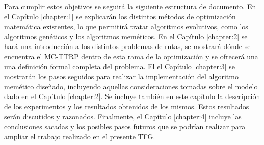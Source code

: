 \documentclass[11pt,a4paper]{book}
\theoremstyle{definition}
\theoremstyle{remark}
\begin{document}
Para cumplir estos objetivos se seguirá la siguiente estructura de documento. En el Capítulo \ref{chapter:1} se explicarán los distintos métodos de optimización matemática existentes, lo que permitirá tratar algoritmos evolutivos, como los algoritmos genéticos y los algoritmos meméticos. En el Capítulo \ref{chapter:2} se hará una introducción a los distintos problemas de rutas, se mostrará dónde se encuentra el MC-TTRP dentro de esta rama de la optimización y se ofrecerá una una definición formal completa del problema. El el Capítulo \ref{chapter:3} se mostrarán los pasos seguidos para realizar la implementación del algoritmo memético diseñado, incluyendo aquellas consideraciones tomadas sobre el modelo dado en el Capítulo \ref{chapter:2}. Se incluye también en este capítulo la descripción de los experimentos y los resultados obtenidos de los mismos. Estos resultados serán discutidos y razonados. Finalmente, el Capítulo \ref{chapter:4} incluye las conclusiones sacadas y los posibles pasos futuros que se podrían realizar para ampliar el trabajo realizado en el presente TFG. 


\mainmatter







\appendix
\renewcommand{\thechapter}{\Roman{chapter}}




\backmatter



\end{document}
